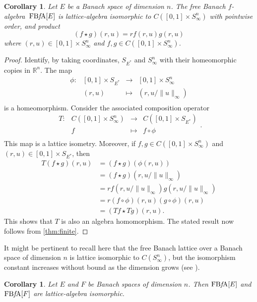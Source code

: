 \documentclass{memo-l}
\newtheorem{cor}[theorem]{Corollary}
\theoremstyle{definition}
\theoremstyle{remark}
\numberwithin{section}{chapter}
\numberwithin{equation}{chapter}
\newcommand\R{\ensuremath{\mathbb{R}}}
\newcommand{\falg}{$f\!$-algebra}
\newcommand{\FBFA}[1]{\operatorname{FB{\it f}\!A}[#1]}
\newcommand{\Sinfn}{S_\infty^n}
\begin{document}
\begin{cor}
    Let $E$ be a Banach space of dimension $n$. The free Banach \falg\
    $\FBFA E$ is lattice-algebra isomorphic to $C([0,1]\times \Sinfn)$
    with pointwise order, and product
    \[
        (f\star g)(r,u)=r f(r,u) g(r,u)
    \]
    where $(r,u)\in [0,1]\times \Sinfn$  and $f,g \in C([0,1]\times
    \Sinfn)$.
\end{cor}
\begin{proof}
    Identify, by taking coordinates, $S_{E^{*}}$ and $\Sinfn$ with
    their homeomorphic copies in $\R^{n}$. The map
    \[
    \begin{array}{cccc}
        \phi \colon& [0,1]\times S_{E^{*}} & \longrightarrow & [0,1]\times \Sinfn \\
            & (r,u) & \longmapsto & (r,u/\|u\|_\infty)  \\
    \end{array}
    \]
    is a homeomorphism. Consider the associated composition operator
    \[
    \begin{array}{cccc}
        T\colon& C([0,1]\times \Sinfn) & \longrightarrow &
        C([0,1]\times S_{E^{*}}) \\
            & f & \longmapsto & f\circ \phi \\
    \end{array}.
    \]
    This map is a lattice isometry. Moreover, if $f,g \in C([0,1]\times \Sinfn)$ and
    $(r,u)\in [0,1]\times S_{E^{*}}$, then
    \begin{align*}
        T(f\star g)(r,u)&=(f\star g)(\phi (r,u))\\
                        &=(f\star g)(r,u/\|u\|_\infty )\\
                        &=rf(r,u/\|u\|_\infty)g(r,u/\|u\|_\infty)\\
                        &=r (f\circ \phi )(r,u) (g\circ \phi )(r,u)\\
                        &=(Tf\star Tg)(r,u).
    \end{align*}
    This shows that $T$ is also an algebra homomorphism. The stated
    result now follows from \cref{thm:finite}.
\end{proof}

It might be pertinent to recall here that the free Banach lattice over a Banach space of dimension $n$ is lattice isomorphic to $C(\Sinfn)$, but the isomorphism constant increases without bound as the dimension grows (see \cite[Section 9]{oikhberg_etal2022}).

\begin{cor}\label{cor:dim_isomorphic}
    Let $E$ and $F$ be Banach spaces of dimension $n$. Then $\FBFA E$
    and $\FBFA F$ are lattice-algebra isomorphic.
\end{cor}
\end{document}

